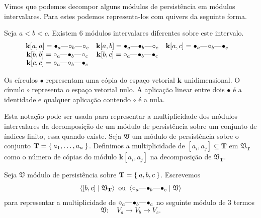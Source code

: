 Vimos que podemos decompor alguns módulos de persistência em módulos intervalares. Para estes podemos representa-los 
com quivers da seguinte forma. 
\begin{ex}
    Seja $a < b < c$. Existem $6$ módulos intervalares diferentes sobre este intervalo.
\begin{equation*} 
    \begin{matrix}
        \mathbf{k}[a,a] = \qon{a} \qem \qoff{b} \qem \qoff{c} & \mathbf{k}[a,b] = \qon{a} \qem \qon{b} \qem \qoff{c}& 
                            \mathbf{k}[a,c] = \qon{a} \qem \qoff{b} \qem \qon{c}\\
        \mathbf{k}[b,b] = \qoff{a} \qem \qon{b} \qem \qoff{c}& \mathbf{k}[b,c] = \qoff{a} \qem \qon{b} \qem \qon{c}& \\
        \mathbf{k}[c,c] = \qoff{a} \qem \qoff{b} \qem \qon{c}& & & 
    \end{matrix}
\end{equation*}
\end{ex}

Os círculos $\bullet$ representam uma cópia do espaço vetorial $\mathbf{k}$ unidimensional. O círculo $\circ$ representa o 
espaço vetorial nulo. A aplicação linear entre dois $\bullet$ é a identidade e qualquer aplicação contendo $\circ$ é a
nula.

Esta notação pode ser usada para representar a multiplicidade dos módulos intervalares da decomposição
de um módulo de persistência sobre um conjunto de índices finito, essa quando existe. Seja $\mathfrak{V}$
um módulo de persistência sobre o conjunto $\mathbf{T} = \Set{a_1, \dots, a_n}$. Definimos a multiplicidade
de $[a_i, a_j] \subseteq \mathbf{T}$ em $\mathfrak{V}_{\mathbf{T}}$ como o número de cópias do módulo
$\mathbf{k}[a_i,a_j]$ na decomposição de $\mathfrak{V}_{\mathbf{T}}$. 

\begin{ex}
    Seja $\mathfrak{V}$ módulo de persistência sobre $\mathbf{T} = \Set{a,b,c}$. Escrevemos
    \begin{equation*}
        \innerproduct{[b,c] \mid \mathfrak{V}_{\mathbf{T}}} \text{ ou } \innerproduct{\qoff{a} \qem \qon{b} 
        \qem \qon{c} \mid \mathfrak{V}}
    \end{equation*}
    para representar a multiplicidade de $\qoff{a} \qem \qon{b} \qem \qon{c}$ no seguinte módulo de $3$ termos
    \begin{equation*}
        \mathfrak{V} : \quad V_{a} \rightarrow V_{b} \rightarrow V_{c}.
    \end{equation*}
\end{ex}

